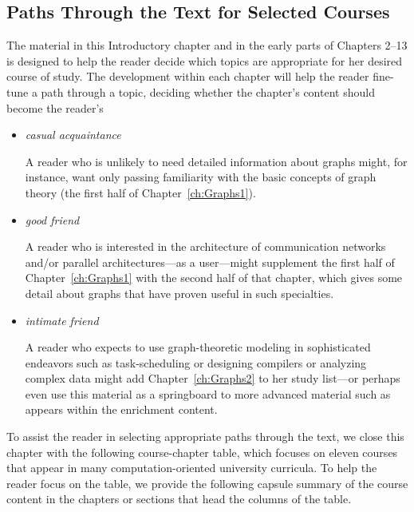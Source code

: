 \subsection{Paths Through the Text for Selected Courses}

The material in this Introductory chapter and in the early parts of Chapters 2--13 is designed to help the reader decide which topics are appropriate for her desired course of study.  The development within each chapter will help the reader fine-tune a path through a topic, deciding whether the chapter's content should become the reader's
\begin{itemize}
\item
{\em casual acquaintance}

\smallskip

A reader who is unlikely to need detailed information about graphs might, for instance, want only passing familiarity with the basic concepts of graph theory (the first half of Chapter~\ref{ch:Graphs1}).

\medskip\item
{\em good friend}

\smallskip

A reader who is interested in the architecture of communication networks and/or parallel architectures---as a user---might supplement the first half of Chapter~\ref{ch:Graphs1} with the second half of that chapter, which gives some detail about graphs that have proven useful in such specialties.

\medskip\item
{\em intimate friend}

\smallskip

A reader who expects to use graph-theoretic modeling in sophisticated endeavors such as 
task-scheduling or designing compilers or analyzing complex data might add Chapter~\ref{ch:Graphs2} to her study list---or perhaps even use this material as a springboard to more advanced material such as appears within the enrichment content.
\end{itemize}

\bigskip

To assist the reader in selecting appropriate paths through the text, we close this chapter with the following course-chapter table, which focuses on eleven courses that appear in many computation-oriented university curricula.  To help the reader focus on the table, we provide the following capsule summary of the course content in the chapters or sections  that head the columns of the table.

